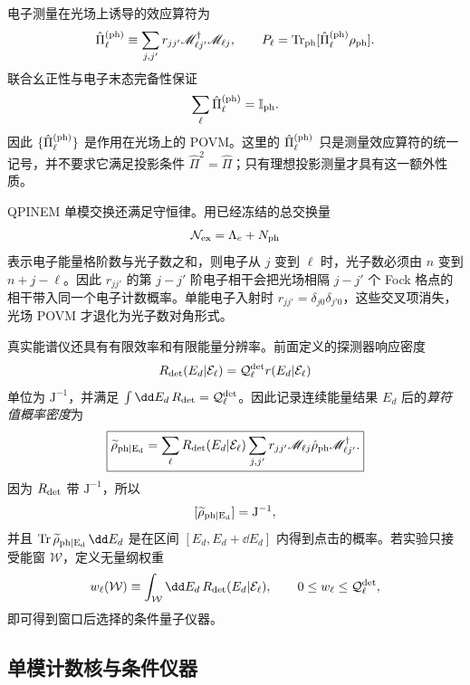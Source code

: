 电子测量在光场上诱导的效应算符为
\begin{equation*}
\hat\Pi_\ell^{({\rm ph})}
\equiv\sum_{j,j'}r_{jj'}
\mathscr M_{\ell j'}^\dagger\mathscr M_{\ell j},
\qquad
P_\ell=\operatorname{Tr}_{\rm ph}
[\hat\Pi_\ell^{({\rm ph})}\rho_{\rm ph}].
\end{equation*}
联合幺正性与电子末态完备性保证
\begin{equation*}
\sum_\ell \hat\Pi_\ell^{({\rm ph})}=\mathbb I_{\rm ph}.
\end{equation*}
因此 $\{\hat\Pi_\ell^{({\rm ph})}\}$ 是作用在光场上的 POVM。这里的 $\hat\Pi_\ell^{({\rm ph})}$ 只是测量效应算符的统一记号，并不要求它满足投影条件 $\hat\Pi^2=\hat\Pi$；只有理想投影测量才具有这一额外性质。

QPINEM 单模交换还满足守恒律。用已经冻结的总交换量
\[
\mathcal N_{\rm ex}=\Lambda_e+N_{\rm ph}
\]
表示电子能量格阶数与光子数之和，则电子从 $j$ 变到 $\ell$ 时，光子数必须由 $n$ 变到 $n+j-\ell$。因此 $r_{jj'}$ 的第 $j-j'$ 阶电子相干会把光场相隔 $j-j'$ 个 Fock 格点的相干带入同一个电子计数概率。单能电子入射时 $r_{jj'}=\delta_{j0}\delta_{j'0}$，这些交叉项消失，光场 POVM 才退化为光子数对角形式。

真实能谱仪还具有有限效率和有限能量分辨率。前面定义的探测器响应密度
\[
R_{\rm det}(E_d|\mathcal E_\ell)
=\mathcal Q_\ell^{\rm det} r(E_d|\mathcal E_\ell)
\]
单位为 $\mathrm{J^{-1}}$，并满足 $\int\dd E_d\,R_{\rm det}=\mathcal Q_\ell^{\rm det}$。因此记录连续能量结果 $E_d$ 后的\emph{算符值概率密度}为
\begin{equation}
\boxed{
\widetilde\rho_{\rm ph|E_d}
=\sum_\ell R_{\rm det}(E_d|\mathcal E_\ell)
\sum_{j,j'}r_{jj'}
\mathscr M_{\ell j}\hat\rho_{\rm ph}
\mathscr M_{\ell j'}^\dagger.}
\label{eq:conditional_photon_detector_coarse_graining}
\end{equation}
因为 $R_{\rm det}$ 带 $\mathrm{J^{-1}}$，所以
\[
[\widetilde\rho_{\rm ph|E_d}]=\mathrm{J^{-1}},
\]
并且 $\operatorname{Tr}\widetilde\rho_{\rm ph|E_d}\,\dd E_d$ 是在区间 $[E_d,E_d+\dd E_d]$ 内得到点击的概率。若实验只接受能窗 $\mathcal W$，定义无量纲权重
\[
w_\ell(\mathcal W)
\equiv\int_{\mathcal W}\dd E_d\,
R_{\rm det}(E_d|\mathcal E_\ell),
\qquad 0\le w_\ell\le\mathcal Q_\ell^{\rm det},
\]
即可得到窗口后选择的条件量子仪器。

\subsection{单模计数核与条件仪器}\label{subsec:single-mode-number-instrument-dp19}

